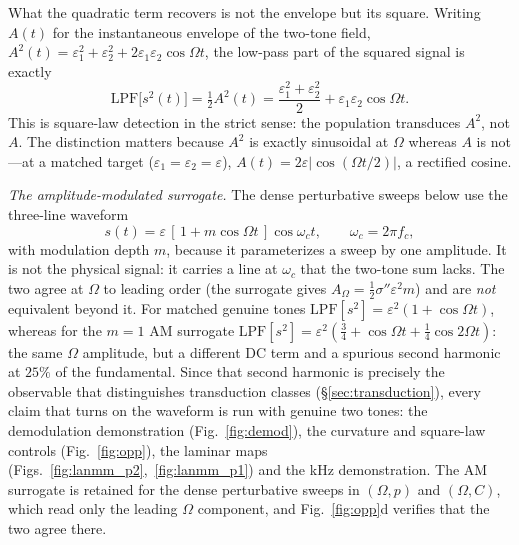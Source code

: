 \documentclass[11pt,a4paper]{article}
\newcommand{\Sig}{\sigma}
\newcommand{\half}{\tfrac{1}{2}}
\begin{document}
What the quadratic term recovers is not the envelope but its square. Writing $A(t)$ for
the instantaneous envelope of the two-tone field,
$A^2(t)=\varepsilon_1^2+\varepsilon_2^2+2\varepsilon_1\varepsilon_2\cos\Omega t$, the
low-pass part of the squared signal is exactly
\begin{equation}
\mathrm{LPF}\big[s^2(t)\big]=\half A^2(t)
=\frac{\varepsilon_1^2+\varepsilon_2^2}{2}+\varepsilon_1\varepsilon_2\cos\Omega t .
\label{eq:sqenv}
\end{equation}
This is square-law detection in the strict sense: the population transduces $A^2$, not
$A$. The distinction matters because $A^2$ is exactly sinusoidal at $\Omega$
whereas $A$ is not---at a matched target ($\varepsilon_1=\varepsilon_2=\varepsilon$),
$A(t)=2\varepsilon|\cos(\Omega t/2)|$, a rectified cosine.

\emph{The amplitude-modulated surrogate.} The dense perturbative sweeps below use the
three-line waveform
\begin{equation}
s(t)=\varepsilon\,[\,1+m\cos\Omega t\,]\cos\omega_c t,\qquad \omega_c=2\pi f_c ,
\label{eq:amsur}
\end{equation}
with modulation depth $m$, because it parameterizes a sweep by one amplitude. It is not
the physical signal: it carries a line at $\omega_c$ that the two-tone sum lacks. The two
agree at $\Omega$ to leading order (the surrogate gives
$A_\Omega=\half\Sig''\varepsilon^2m$) and are \emph{not} equivalent beyond it. For matched genuine tones $\mathrm{LPF}[s^2]=\varepsilon^2(1+\cos\Omega t)$,
whereas for the $m=1$ AM surrogate
$\mathrm{LPF}[s^2]=\varepsilon^2(\tfrac34+\cos\Omega t+\tfrac14\cos2\Omega t)$: the same
$\Omega$ amplitude, but a different DC term and a spurious second harmonic at $25\%$ of
the fundamental. Since that second harmonic is precisely the observable that
distinguishes transduction classes (\S\ref{sec:transduction}), every claim that turns on
the waveform is run with genuine two tones: the demodulation demonstration
(Fig.~\ref{fig:demod}), the curvature and square-law controls (Fig.~\ref{fig:opp}), the
laminar maps (Figs.~\ref{fig:lanmm_p2},~\ref{fig:lanmm_p1}) and the kHz demonstration.
The AM surrogate is retained for the dense perturbative sweeps in $(\Omega,p)$ and
$(\Omega,C)$, which read only the leading $\Omega$ component, and
Fig.~\ref{fig:opp}d verifies that the two agree there.
\end{document}
